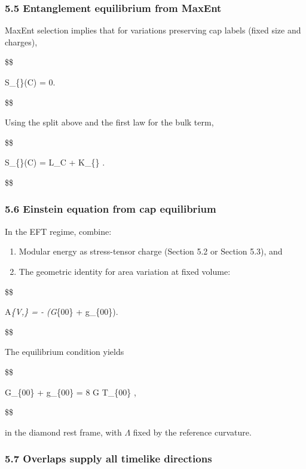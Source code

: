 \documentclass[11pt,a4paper]{article}
\theoremstyle{remark}
\providecommand{\tightlist}{%
  \setlength{\itemsep}{0pt}\setlength{\parskip}{0pt}}
\begin{document}
\subsubsection{5.5 Entanglement equilibrium from MaxEnt}\label{entanglement-equilibrium-from-maxent}

MaxEnt selection implies that for variations preserving cap labels (fixed size
and charges),

\$\$

\delta S\_\{\}(C) = 0.

\$\$

Using the split above and the first law for the bulk term,

\$\$

\delta S\_\{\}(C) = \delta \langle L\_C \rangle + \delta \langle K\_\{\} \rangle.

\$\$

\subsubsection{5.6 Einstein equation from cap equilibrium}\label{einstein-equation-from-cap-equilibrium}

In the EFT regime, combine:

\begin{enumerate}
\def\labelenumi{\arabic{enumi})}
\tightlist
\item
  Modular energy as stress-tensor charge (Section 5.2 or Section 5.3), and
\item
  The geometric identity for area variation at fixed volume:
\end{enumerate}

\$\$

\delta A\textbar{}\emph{\{V,\lambda\} = - (G}\{00\} + \lambda g\_\{00\}).

\$\$

The equilibrium condition yields

\$\$

G\_\{00\} + \Lambda g\_\{00\} = 8 \pi G \langle T\_\{00\} \rangle,

\$\$

in the diamond rest frame, with \(\Lambda\) fixed by the reference curvature.

\subsubsection{5.7 Overlaps supply all timelike directions}\label{overlaps-supply-all-timelike-directions}
\end{document}
